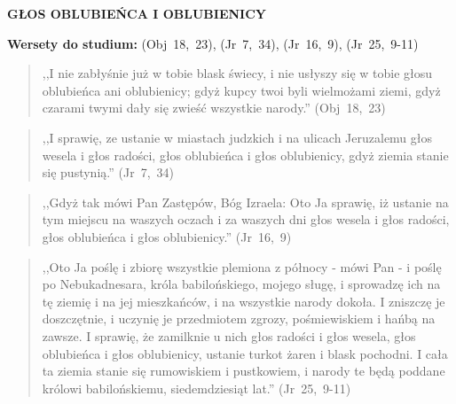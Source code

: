 \documentclass[10pt,a4paper,oneside]{article}
\begin{document}
\centerline{\textbf{\MakeUppercase{Głos Oblubieńca i Oblubienicy}}}
\begin{center}
\textbf{Wersety do studium:} \mbox{(Obj 18, 23)}, \mbox{(Jr 7, 34)}, \mbox{(Jr 16, 9)}, \mbox{(Jr 25, 9-11)}
\end{center}
\begin{quote}
,,I nie zabłyśnie już w tobie blask świecy, i nie usłyszy się w tobie głosu oblubieńca ani oblubienicy; gdyż kupcy twoi byli wielmożami ziemi, gdyż czarami twymi dały się zwieść wszystkie narody.'' \mbox{(Obj 18, 23)}
\end{quote}
\begin{quote}
,,I sprawię, ze ustanie w miastach judzkich i na ulicach Jeruzalemu głos wesela i głos radości, głos oblubieńca i głos oblubienicy, gdyż ziemia stanie się pustynią.'' \mbox{(Jr 7, 34)}
\end{quote}
\begin{quote}
,,Gdyż tak mówi Pan Zastępów, Bóg Izraela: Oto Ja sprawię, iż ustanie na tym miejscu na waszych oczach i za waszych dni głos wesela i głos radości, głos oblubieńca i głos oblubienicy.'' \mbox{(Jr 16, 9)}
\end{quote}
\begin{quote}
,,Oto Ja poślę i zbiorę wszystkie plemiona z północy - mówi Pan - i poślę po Nebukadnesara, króla babilońskiego, mojego sługę, i sprowadzę ich na tę ziemię i na jej mieszkańców, i na wszystkie narody dokoła. I zniszczę je doszczętnie, i uczynię je przedmiotem zgrozy, pośmiewiskiem i hańbą na zawsze. I sprawię, że zamilknie u nich głos radości i głos wesela, głos oblubieńca i głos oblubienicy, ustanie turkot żaren i blask pochodni. I cała ta ziemia stanie się rumowiskiem i pustkowiem, i narody te będą poddane królowi babilońskiemu, siedemdziesiąt lat.'' \mbox{(Jr 25, 9-11)}
\end{quote}
\end{document}
